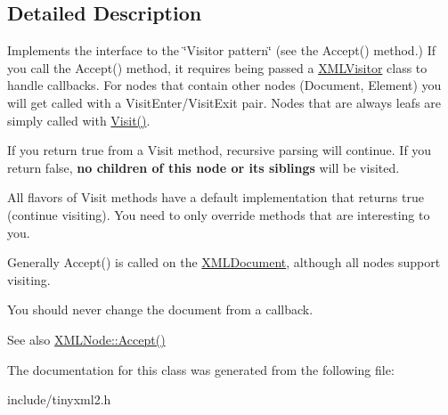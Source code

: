 \subsection{Detailed Description}
Implements the interface to the \char`\"{}\+Visitor pattern\char`\"{} (see the Accept() method.) If you call the Accept() method, it requires being passed a \hyperlink{classtinyxml2_1_1_x_m_l_visitor}{X\+M\+L\+Visitor} class to handle callbacks. For nodes that contain other nodes (Document, Element) you will get called with a Visit\+Enter/\+Visit\+Exit pair. Nodes that are always leafs are simply called with \hyperlink{classtinyxml2_1_1_x_m_l_visitor_adc75bd459fc7ba8223b50f0616767f9a}{Visit()}.

If you return \textquotesingle{}true\textquotesingle{} from a Visit method, recursive parsing will continue. If you return false, {\bfseries no children of this node or its siblings} will be visited.

All flavors of Visit methods have a default implementation that returns \textquotesingle{}true\textquotesingle{} (continue visiting). You need to only override methods that are interesting to you.

Generally Accept() is called on the \hyperlink{classtinyxml2_1_1_x_m_l_document}{X\+M\+L\+Document}, although all nodes support visiting.

You should never change the document from a callback.

\begin{DoxySeeAlso}{See also}
\hyperlink{classtinyxml2_1_1_x_m_l_node_a81e66df0a44c67a7af17f3b77a152785}{X\+M\+L\+Node\+::\+Accept()} 
\end{DoxySeeAlso}


The documentation for this class was generated from the following file\+:\begin{DoxyCompactItemize}
\item 
include/tinyxml2.\+h\end{DoxyCompactItemize}
